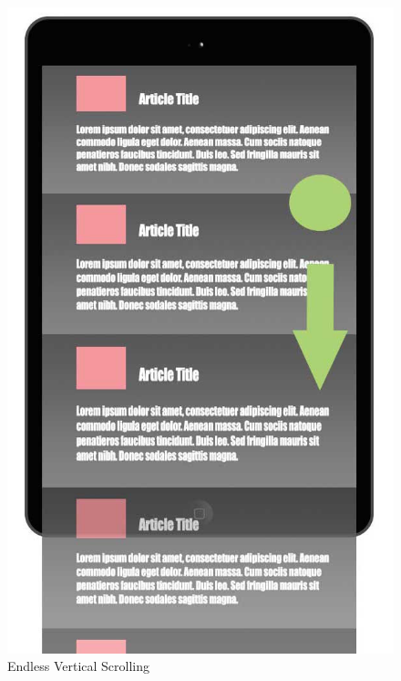 \documentclass[11pt, oneside]{article}   	%
\begin{document}
\begin{figure}[!hb]
    \centering
    \includegraphics[scale=0.3]{Endless-List.jpg}
    \caption{Endless Vertical Scrolling}
    \label{fig:endless-scroll}
\end{figure}
\end{document}
